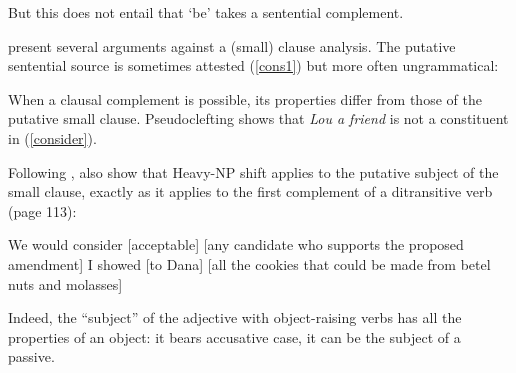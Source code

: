 \documentclass[output=paper]{langsci/langscibook}
\begin{document}
But this does not entail that `be' takes a sentential complement. 




\citet[Ch.3]{PollardandSag1994} present several arguments against a (small) clause analysis. The putative sentential source is sometimes attested (\ref{cons1}) but more often ungrammatical:

	
\eal
{}
\zl

	
When a clausal complement is possible, its properties differ from those of the putative small clause. Pseudoclefting shows that \textit{Lou a friend} is not a constituent in (\ref{consider}).

\eal
{}
\zl

Following \citet{Bresnan1982}, \citet[113]{PollardandSag1994} also show that Heavy-NP shift applies to the putative subject of the small clause, exactly as it applies to the first complement of a ditransitive verb (page 113):

\begin{exe}
\ex \begin{xlist}
\ex   We would consider [acceptable]  [any candidate who supports the proposed amendment]  
\ex   I showed [to Dana]  [all the cookies that could be made from betel nuts and molasses]  
\end{xlist}

\end{exe}

 Indeed, the ``subject'' of the adjective with object-raising verbs has all the properties of an object: it bears accusative case, it can be the subject of a passive.
\end{document}
